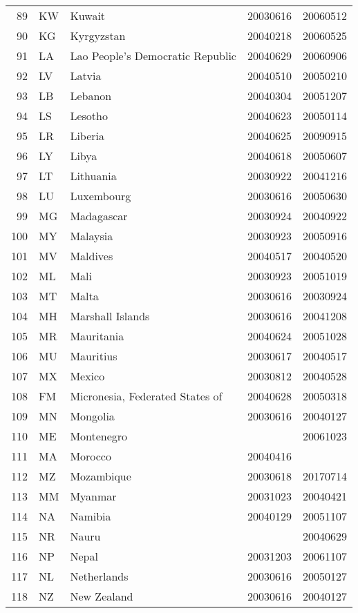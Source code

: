 \begin{longtable}{rllrr}
  89 & KW & Kuwait & 20030616 & 20060512 \\ 
  90 & KG & Kyrgyzstan & 20040218 & 20060525 \\ 
  91 & LA & Lao People's Democratic Republic & 20040629 & 20060906 \\ 
  92 & LV & Latvia & 20040510 & 20050210 \\ 
  93 & LB & Lebanon & 20040304 & 20051207 \\ 
  94 & LS & Lesotho & 20040623 & 20050114 \\ 
  95 & LR & Liberia & 20040625 & 20090915 \\ 
  96 & LY & Libya & 20040618 & 20050607 \\ 
  97 & LT & Lithuania & 20030922 & 20041216 \\ 
  98 & LU & Luxembourg & 20030616 & 20050630 \\ 
  99 & MG & Madagascar & 20030924 & 20040922 \\ 
  100 & MY & Malaysia & 20030923 & 20050916 \\ 
  101 & MV & Maldives & 20040517 & 20040520 \\ 
  102 & ML & Mali & 20030923 & 20051019 \\ 
  103 & MT & Malta & 20030616 & 20030924 \\ 
  104 & MH & Marshall Islands & 20030616 & 20041208 \\ 
  105 & MR & Mauritania & 20040624 & 20051028 \\ 
  106 & MU & Mauritius & 20030617 & 20040517 \\ 
  107 & MX & Mexico & 20030812 & 20040528 \\ 
  108 & FM & Micronesia, Federated States of & 20040628 & 20050318 \\ 
  109 & MN & Mongolia & 20030616 & 20040127 \\ 
  110 & ME & Montenegro &  & 20061023 \\ 
  111 & MA & Morocco & 20040416 &  \\ 
  112 & MZ & Mozambique & 20030618 & 20170714 \\ 
  113 & MM & Myanmar & 20031023 & 20040421 \\ 
  114 & NA & Namibia & 20040129 & 20051107 \\ 
  115 & NR & Nauru &  & 20040629 \\ 
  116 & NP & Nepal & 20031203 & 20061107 \\ 
  117 & NL & Netherlands & 20030616 & 20050127 \\ 
  118 & NZ & New Zealand & 20030616 & 20040127 \\ 

\end{longtable}
